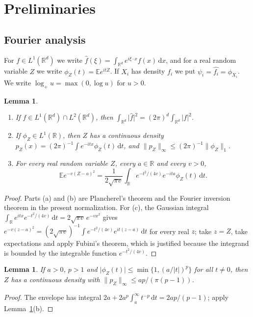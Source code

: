 \documentclass[11pt]{amsart}
\numberwithin{equation}{section}
\newtheorem{lemma}[theorem]{Lemma}
\theoremstyle{definition}
\theoremstyle{remark}
\newcommand{\R}{\mathbb R}
\newcommand{\E}{\mathbb E}
\newcommand{\1}{\mathbf 1}
\newcommand{\dd}{\,\mathrm d}
\newcommand{\logp}{\log_+}
\newcommand{\norm}[1]{\lVert #1\rVert}
\newcommand{\abs}[1]{\lvert #1\rvert}
\begin{document}
\section{Preliminaries}\label{sec:prelim}

\subsection{Fourier analysis}
For $f\in L^1(\R^d)$ we write $\widehat f(\xi)=\int_{\R^d}e^{i\xi\cdot x}f(x)\dd x$, and for a real random variable $Z$ we write $\phi_Z(t)=\E e^{itZ}$. If $X_i$ has density $f_i$ we put $\psi_i=\widehat{f_i}=\phi_{X_i}$. We write $\logp u=\max(0,\log u)$ for $u>0$.

\begin{lemma}\label{lem:fourier}
\begin{enumerate}
\item[(a)] If $f\in L^1(\R^d)\cap L^2(\R^d)$, then $\int_{\R^d}\abs{\widehat f}^2=(2\pi)^d\int_{\R^d}\abs f^2$.
\item[(b)] If $\phi_Z\in L^1(\R)$, then $Z$ has a continuous density $p_Z(x)=(2\pi)^{-1}\int e^{-itx}\phi_Z(t)\dd t$, and $\norm{p_Z}_\infty\le(2\pi)^{-1}\norm{\phi_Z}_1$.
\item[(c)] For every real random variable $Z$, every $a\in\R$ and every $v>0$,
\[
\E e^{-v(Z-a)^2}=\frac1{2\sqrt{\pi v}}\int_\R e^{-t^2/(4v)}e^{-ita}\phi_Z(t)\dd t.
\]
\end{enumerate}
\end{lemma}

\begin{proof}
Parts (a) and (b) are Plancherel's theorem and the Fourier inversion theorem in the present normalization. For (c), the Gaussian integral $\int_\R e^{itx}e^{-t^2/(4v)}\dd t=2\sqrt{\pi v}\,e^{-vx^2}$ gives $e^{-v(z-a)^2}=(2\sqrt{\pi v})^{-1}\int e^{-t^2/(4v)}e^{it(z-a)}\dd t$ for every real $z$; take $z=Z$, take expectations and apply Fubini's theorem, which is justified because the integrand is bounded by the integrable function $e^{-t^2/(4v)}$.
\end{proof}

\begin{lemma}\label{lem:envelope}
If $a>0$, $p>1$ and $\abs{\phi_Z(t)}\le\min\{1,(a/\abs t)^p\}$ for all $t\ne0$, then $Z$ has a continuous density with $\norm{p_Z}_\infty\le ap/(\pi(p-1))$.
\end{lemma}

\begin{proof}
The envelope has integral $2a+2a^p\int_a^\infty t^{-p}\dd t=2ap/(p-1)$; apply Lemma~\ref{lem:fourier}(b).
\end{proof}
\end{document}
